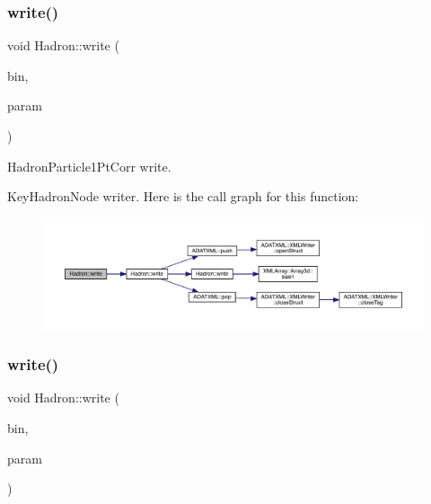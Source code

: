 \subsubsection{\texorpdfstring{write()}{write()}\hspace{0.1cm}{\footnotesize\ttfamily [81/95]}}
{\footnotesize\ttfamily void Hadron\+::write (\begin{DoxyParamCaption}\item[{\mbox{\hyperlink{classADATIO_1_1BinaryWriter}{Binary\+Writer}} \&}]{bin,  }\item[{const \mbox{\hyperlink{structHadron_1_1KeyHadronNode__t}{Key\+Hadron\+Node\+\_\+t}} \&}]{param }\end{DoxyParamCaption})}



Hadron\+Particle1\+Pt\+Corr write. 

Key\+Hadron\+Node writer. Here is the call graph for this function\+:
\nopagebreak
\begin{figure}[H]
\begin{center}
\leavevmode
\includegraphics[width=350pt]{d1/daf/namespaceHadron_a33192b7d206ee95549b4605c3db6cde8_cgraph}
\end{center}
\end{figure}
\mbox{\label{namespaceHadron_aa05ac649ec39cb98483ab55274129758}} 
\subsubsection{\texorpdfstring{write()}{write()}\hspace{0.1cm}{\footnotesize\ttfamily [82/95]}}
{\footnotesize\ttfamily void Hadron\+::write (\begin{DoxyParamCaption}\item[{\mbox{\hyperlink{classADATIO_1_1BinaryWriter}{Binary\+Writer}} \&}]{bin,  }\item[{const \mbox{\hyperlink{structHadron_1_1KeyHadronNPartIrrepOp__t_1_1CGPair__t}{Key\+Hadron\+N\+Part\+Irrep\+Op\+\_\+t\+::\+C\+G\+Pair\+\_\+t}} \&}]{param }\end{DoxyParamCaption})}

